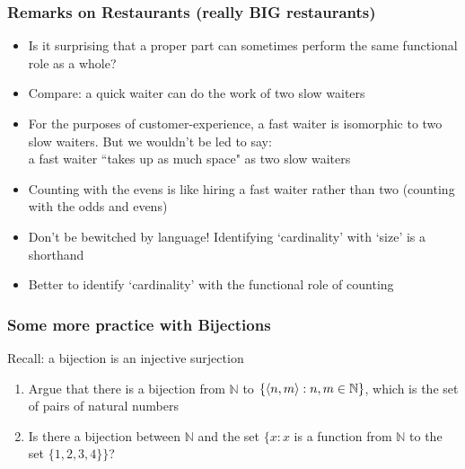 \begin{frame}
\frametitle{Remarks on Restaurants (really BIG restaurants)}

\begin{itemize}[<+->]

\item  Is it surprising that a proper part can sometimes perform the same functional role as a whole? 

\item Compare: a quick waiter can do the work of two slow waiters

\item For the purposes of customer-experience, a fast waiter is isomorphic to two slow waiters. But we wouldn't be led to say: \\ a fast waiter ``takes up as much space" as two slow waiters

\item Counting with the evens is like hiring a fast waiter rather than two (counting with the odds and evens) 

\item Don't be bewitched by language! Identifying `cardinality' with `size' is a shorthand

\item Better to identify `cardinality' with the functional role of counting



\end{itemize}
\end{frame}

\begin{frame}
\frametitle{Some more practice with Bijections}

Recall: a bijection is an injective surjection 

\begin{enumerate}[<+->]


\item Argue that there is a bijection from $\mathbb{N}$ to $\left\{ {\left\langle {n,m} \right\rangle : n,m \in \mathbb{N}} \right\}$, which is the set of pairs of natural numbers

\item Is there a bijection between $\mathbb{N}$ and the set $\{x : x$ is a function from $\mathbb{N}$ to the set $\{1, 2, 3, 4 \} \}$? 



\end{enumerate}
\end{frame}

